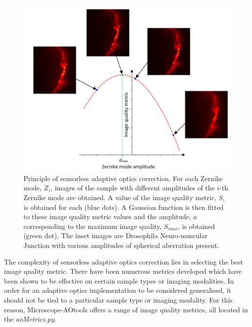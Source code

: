 \begin{figure}[h]
	\centering
	\includegraphics[width=1\textwidth,scale=0.5]{./images/sensorless_aberration_fitting_w_images.png}
	\caption[Principle of sensorless adaptive optics correction.]{Principle of sensorless adaptive optics correction. For each Zernike mode, $Z_i$, images of the sample with different amplitudes of the $i$-th Zernike mode are obtained. A value of the image quality metric, $S$, is obtained for each (blue dots). A Gaussian function is then fitted to these image quality metric values and the amplitude, $a$ corresponding to the maximum image quality, $S_{max}$, is obtained (green dot). The inset images are Drosophila Neuro-muscular Junction with various amplitudes of spherical aberration present.}
	\label{fig:sensorless_correction_method}
\end{figure}

The complexity of sensorless adaptive optics correction lies in selecting the best image quality metric. There have been numerous metrics developed which have been shown to be effective on certain sample types or imaging modalities\cite{burke2015adaptive,booth2002adaptive,fienup2003aberration,debarre2008adaptive}. In order for an adaptive optics implementation to be considered generalised, it should not be tied to a particular sample type or imaging modality. For this reason, Microscope-AOtools offers a range of image quality metrics, all located in the \textit{aoMetrics.py}.  

